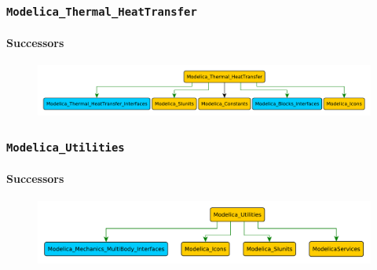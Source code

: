 \documentclass[aspectratio=1610]{beamer}
\begin{document}
\begin{frame}
  \frametitle{\texttt{Modelica\_Thermal\_HeatTransfer}}
  \framesubtitle{Successors}
  \begin{figure}
      \includegraphics[width=\textwidth]{Modelica_Thermal_HeatTransfer}
  \end{figure}
\end{frame}

\begin{frame}
  \frametitle{\texttt{Modelica\_Utilities}}
  \framesubtitle{Successors}
  \begin{figure}
      \includegraphics[width=\textwidth]{Modelica_Utilities}
  \end{figure}
\end{frame}
\end{document}
